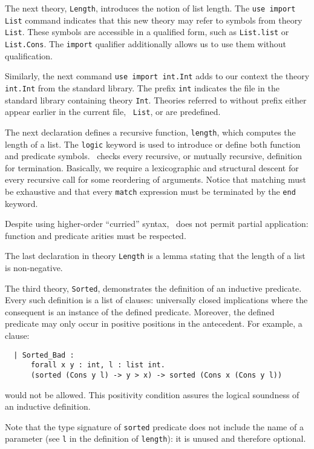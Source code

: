 The next theory, \texttt{Length}, introduces the notion of list
length. The \texttt{use import List} command indicates that this new
theory may refer to symbols from theory \texttt{List}. These symbols
are accessible in a qualified form, such as \texttt{List.list} or
\texttt{List.Cons}. The \texttt{import} qualifier additionally allows
us to use them without qualification.

Similarly, the next command \texttt{use import int.Int} adds to our
context the theory \texttt{int.Int} from the standard library. The
prefix \texttt{int} indicates the file in the standard library
containing theory \texttt{Int}. Theories referred to without prefix
either appear earlier in the current file, \eg\ \texttt{List}, or are
predefined.

The next declaration defines a recursive function, \texttt{length},
which computes the length of a list. The \texttt{logic} keyword is
used to introduce or define both function and predicate symbols.
\why\ checks every recursive, or mutually recursive, definition for
termination. Basically, we require a lexicographic and structural
descent for every recursive call for some reordering of arguments.
Notice that matching must be exhaustive and that every \texttt{match}
expression must be terminated by the \texttt{end} keyword.

Despite using higher-order ``curried'' syntax, \why\ does not permit
partial application: function and predicate arities must be respected.

The last declaration in theory \texttt{Length} is a lemma stating that
the length of a list is non-negative.

The third theory, \texttt{Sorted}, demonstrates the definition of
an inductive predicate. Every such definition is a list of clauses:
universally closed implications where the consequent is an instance
of the defined predicate. Moreover, the defined predicate may only
occur in positive positions in the antecedent. For example, a clause:
\begin{verbatim}
  | Sorted_Bad :
      forall x y : int, l : list int.
      (sorted (Cons y l) -> y > x) -> sorted (Cons x (Cons y l))
\end{verbatim}
would not be allowed. This positivity condition assures the logical
soundness of an inductive definition.

Note that the type signature of \texttt{sorted} predicate does not
include the name of a parameter (see \texttt{l} in the definition
of \texttt{length}): it is unused and therefore optional.


